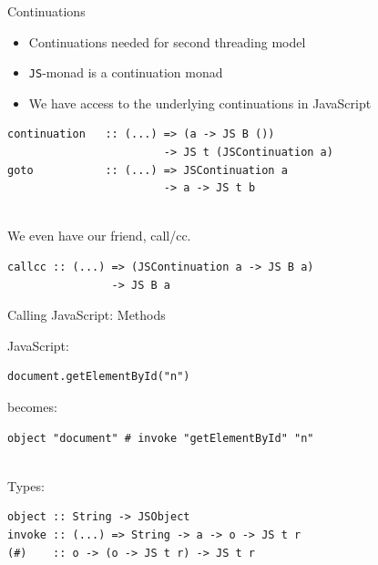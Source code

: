 \documentclass{beamer}
\begin{document}
\begin{frame}[fragile]{Continuations}

\begin{itemize}
\item Continuations needed for second threading model
\item \verb`JS`-monad is a continuation monad
\item We have access to the underlying continuations in JavaScript
\end{itemize}


\begin{codeblock}[0.9]
\begin{verbatim}
continuation   :: (...) => (a -> JS B ()) 
                        -> JS t (JSContinuation a)
goto           :: (...) => JSContinuation a
                        -> a -> JS t b
\end{verbatim}
\end{codeblock}

~\\
We even have our friend, call/cc.

\begin{codeblock}[0.9]
\begin{verbatim}
callcc :: (...) => (JSContinuation a -> JS B a)
                -> JS B a
\end{verbatim}
\end{codeblock}

\end{frame}

\begin{frame}[fragile]{Calling JavaScript: Methods}
        
JavaScript:

\begin{codeblock}[0.6]
\begin{verbatim}
document.getElementById("n")
\end{verbatim}
\end{codeblock}

becomes:

\begin{codeblock}[0.8]
\begin{verbatim}
object "document" # invoke "getElementById" "n"
\end{verbatim}
\end{codeblock}

~\\
Types:

\begin{codeblock}[0.8]
\begin{verbatim}
object :: String -> JSObject
invoke :: (...) => String -> a -> o -> JS t r
(#)    :: o -> (o -> JS t r) -> JS t r
\end{verbatim}
\end{codeblock}

\end{frame}
\end{document}
